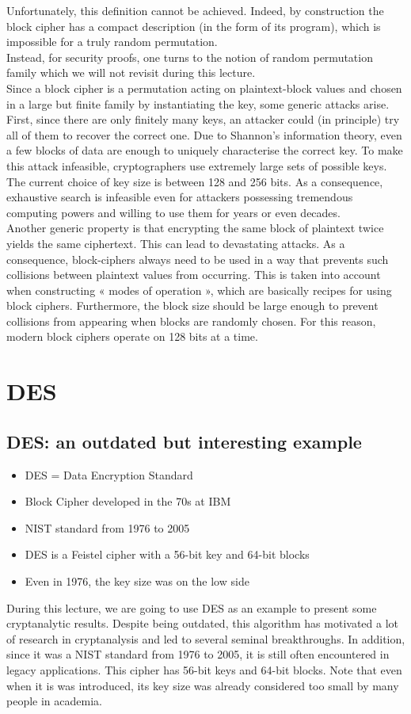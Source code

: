 	Unfortunately, this definition cannot be achieved. 
	Indeed, by construction the block cipher has a compact description (in the form of its program), which is impossible for a truly random permutation.\\
	Instead, for security proofs, one turns to the notion of random permutation family which we will not revisit during this lecture.\\
	Since a block cipher is a permutation acting on plaintext-block values and chosen in a large but finite family by instantiating the key, some generic attacks arise. 
	First, since there are only finitely many keys, an attacker could (in principle) try all of them to recover the correct one. 
	Due to Shannon’s information theory, even a few blocks of data are enough to uniquely characterise the correct key. 
	To make this attack infeasible, cryptographers use extremely large sets of possible keys. 
	The current choice of key size is between 128 and 256 bits. 
	As a consequence, exhaustive search is infeasible even for attackers possessing tremendous computing powers and willing to use them for years or even decades.\\
	Another generic property is that encrypting the same block of plaintext twice yields the same ciphertext. 
	This can lead to devastating attacks. 
	As a consequence, block-ciphers always need to be used in a way that prevents such collisions between plaintext values from occurring. 
	This is taken into account when constructing « modes of operation », which are basically recipes for using block ciphers. 
	Furthermore, the block size should be large enough to prevent collisions from appearing when blocks are randomly chosen. 
	For this reason, modern block ciphers operate on 128 bits at a time.

\newpage
\section{DES}
	\subsection{DES: an outdated but interesting example}
		\begin{itemize}
			\item DES = Data Encryption Standard
			\item Block Cipher developed in the 70s at IBM
			\item NIST standard from 1976 to 2005
			\item DES is a Feistel cipher with a 56-bit key and 64-bit blocks
			\item Even in 1976, the key size was on the low side
		\end{itemize}
		During this lecture, we are going to use DES as an example to present some cryptanalytic results. 
		Despite being outdated, this algorithm has motivated a lot of research in cryptanalysis and led to several seminal breakthroughs. 
		In addition, since it was a NIST standard from 1976 to 2005, it is still often encountered in legacy applications. 
		This cipher has 56-bit keys and 64-bit blocks. 
		Note that even when it is was introduced, its key size was already considered too small by many people in academia.
	
